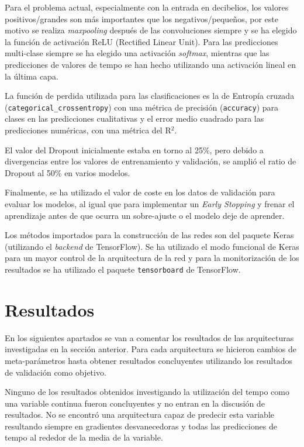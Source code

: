 Para el problema actual, especialmente con la entrada en decibelios, los valores positivos/grandes son más importantes que los negativos/pequeños, por este motivo se realiza \textit{maxpooling} después de las convoluciones siempre y se ha elegido la función de activación ReLU (Rectified Linear Unit). Para las predicciones multi-clase siempre se ha elegido una activación \textit{softmax}, mientras que las predicciones de valores de tempo se han hecho utilizando una activación lineal en la última capa.

La función de perdida utilizada para las clasificaciones es la de Entropía cruzada (\texttt{categorical\_crossentropy}) con una métrica de precisión (\texttt{accuracy}) para clases en las predicciones cualitativas y el error medio cuadrado para las predicciones numéricas, con una métrica del R$^2$. 

El valor del Dropout inicialmente estaba en torno al 25\%, pero debido a divergencias entre los valores de entrenamiento y validación, se amplió el ratio de Dropout al 50\% en varios modelos. 

Finalmente, se ha utilizado el valor de coste en los datos de validación para evaluar los modelos, al igual que para implementar un \textit{Early Stopping} y frenar el aprendizaje antes de que ocurra un sobre-ajuste o el modelo deje de aprender.

Los métodos importados para la construcción de las redes son del paquete Keras (utilizando el \textit{backend} de TensorFlow). Se ha utilizado el modo funcional de Keras para un mayor control de la arquitectura de la red y para la monitorización de los resultados se ha utilizado el paquete \texttt{tensorboard} de TensorFlow.

\section{Resultados}\label{sec:resultados}

\noindent En los siguientes apartados se van a comentar los resultados de las arquitecturas investigadas en la sección anterior. Para cada arquitectura se hicieron cambios de meta-parámetros hasta obtener resultados concluyentes utilizando los resultados de validación como objetivo.

Ninguno de los resultados obtenidos investigando la utilización del tempo como una variable continua fueron concluyentes y no entran en la discusión de resultados. No se encontró una arquitectura capaz de predecir esta variable resultando siempre en gradientes desvanecedoras y todas las predicciones de tempo al rededor de la media de la variable.

